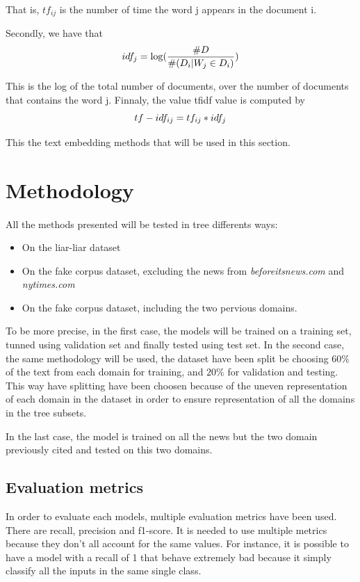 That is, $tf_{ij}$ is the number of time the word j appears in the document i. 

Secondly, we have that \begin{equation*}
	idf_{j} = \log(\frac{\#D}{\#(D_i | W_j \in D_i)}) \\
\end{equation*}

This is the log of the total number of documents, over the number of documents that contains the word j.
Finnaly, the value tfidf value is computed by \begin{equation}
	tf-idf_{ij} = tf_{ij} * idf_{j} \\
\end{equation}

This the text embedding methods that will be used in this section. 

\section{Methodology}
\paragraph{} All the methods presented will be tested in tree differents ways: 
\begin{itemize}
	\item On the liar-liar dataset
	\item On the fake corpus dataset, excluding the news from \textit{beforeitsnews.com} and \textit{nytimes.com}
	\item On the fake corpus dataset, including the two pervious domains. 
\end{itemize}

To be more precise, in the first case, the models will be trained on a training set, tunned using validation set and finally tested using test set. In the second case, the same methodology will be used, the dataset have been split be choosing $60\%$ of the text from each domain for training, and $20\%$ for validation and testing. This way have splitting have been choosen because of the uneven representation of each domain in the dataset in order to ensure representation of all the domains in the tree subsets. 

In the last case, the model is trained on all the news but the two domain previously cited and tested on this two domains.  
\subsection{Evaluation metrics}
In order to evaluate each models, multiple evaluation metrics have been used. There are recall, precision and f1-score. It is needed to use multiple metrics because they don't all account for the same values. For instance, it is possible to have a model with a recall of 1 that behave extremely bad because it simply classify all the inputs in the same single class. 

